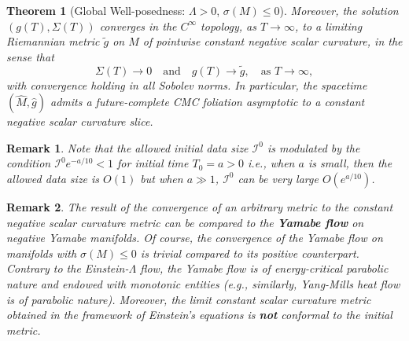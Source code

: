 \documentclass{amsart}
\newtheorem{remark}{Remark}
\newtheorem{theorem}{Theorem}[section]
\begin{document}
\begin{theorem}[Global Well-posedness: $\Lambda > 0$, $\sigma(M) \leq 0$]
\noindent Moreover, the solution $(g(T), \Sigma(T))$ converges in the $C^\infty$ topology, as $T \to \infty$, to a limiting Riemannian metric $\widetilde{g}$ on $M$ of pointwise constant negative scalar curvature, in the sense that
\[
\Sigma(T) \to 0 \quad \text{and} \quad g(T) \to \widetilde{g}, \quad \text{as } T \to \infty,
\]
with convergence holding in all Sobolev norms. In particular, the spacetime $(\widehat{M}, \widehat{g})$ admits a future-complete CMC foliation asymptotic to a constant negative scalar curvature slice.
\end{theorem}




 
\begin{remark}
Note that the allowed initial data size $\mathcal{I}^{0}$ is modulated by the condition $\mathcal{I}^{0}e^{-a/10}<1$ for initial time $T_{0}=a>0$ i.e., when $a$ is small, then the allowed data size is $O(1)$ but when $a\gg 1$, $\mathcal{I}^{0}$ can be very large $O(e^{a/10})$.    
\end{remark}

\begin{remark}
The result of the convergence of an arbitrary metric to the constant negative scalar curvature metric can be compared to the \textbf{Yamabe flow} on negative Yamabe manifolds. Of course, the convergence of the Yamabe flow on manifolds with $\sigma(M)\leq 0$ is trivial compared to its positive counterpart. Contrary to the Einstein-$\Lambda$ flow, the Yamabe flow is of energy-critical parabolic nature and endowed with monotonic entities (e.g., similarly, Yang-Mills heat flow \cite{YM} is of parabolic nature). Moreover, the limit constant scalar curvature metric obtained in the framework of Einstein's equations is \textbf{not} conformal to the initial metric.  
\end{remark}
\end{document}
